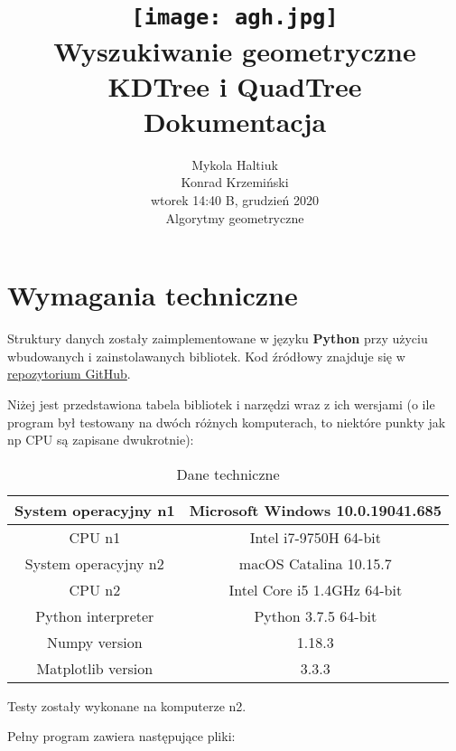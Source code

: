 \documentclass[a4paper, 12pt]{article}
\title{\texttt{[image: agh.jpg]} \vspace{50pt} \\\AND Wyszukiwanie geometryczne \\\AND KDTree i QuadTree \\\AND Dokumentacja}
\author{Mykola Haltiuk \\\AND Konrad Krzemiński \\\AND wtorek 14:40 B, grudzień 2020 \\\AND Algorytmy geometryczne}
\date{}
\begin{document}
\maketitle
\newpage
\tableofcontents
\newpage

\part{Wymagania techniczne}
  \quad Struktury danych zostały zaimplementowane w języku \textbf{Python} przy użyciu wbudowanych i zainstolawanych bibliotek. Kod źródłowy znajduje się w \href{https://github.com/Goader/KDTree_QuadTree}{repozytorium GitHub}.

  \noindent
  \quad Niżej jest przedstawiona tabela bibliotek i narzędzi wraz z ich wersjami (o ile program był testowany na dwóch różnych komputerach, to niektóre punkty jak np CPU są zapisane dwukrotnie):

  \begin{table}[h!]
    \begin{center}
      \begin{tabular}{ |cc| }
      \hline
      System operacyjny n1 & Microsoft Windows  10.0.19041.685 \\ 
      \hline
      CPU n1 & Intel i7-9750H 64-bit \\
      \hline
      System operacyjny n2 & macOS Catalina 10.15.7 \\
      \hline
      CPU n2 & Intel Core i5 1.4GHz 64-bit \\
      \hline
      Python interpreter & Python 3.7.5 64-bit \\
      \hline
      Numpy version & 1.18.3 \\
      \hline
      Matplotlib version & 3.3.3 \\
      \hline
      \end{tabular}
    \end{center}
  \caption{Dane techniczne}
  \end{table}

  \noindent
  \quad Testy zostały wykonane na komputerze n2.

  \noindent
  \quad Pełny program zawiera następujące pliki:
\end{document}
